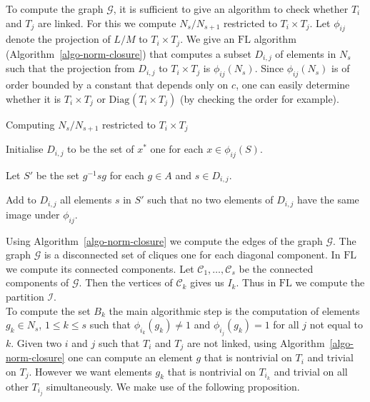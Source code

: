 \documentclass[11pt]{madras}%
\theoremstyle{remark}
\newcommand{\Diag}[2][]{{\ensuremath{\mathrm{Diag}_{{#1}}\left(#2\right)}}}
\begin{document}
To compute the graph $\mathcal{G}$, it is sufficient to give an
algorithm to check whether $T_i$ and $T_j$ are linked.  For this we
compute $N_s/N_{s+1}$ restricted to $T_i \times T_j$. Let $\phi_{ij}$
denote the projection of $L/M$ to $T_i \times T_j$. We give an
$\mathrm{FL}$ algorithm (Algorithm~\ref{algo-norm-closure}) that
computes a subset $D_{i,j}$ of elements in $N_s$ such that the
projection from $D_{i,j}$ to $T_i \times T_j$ is $\phi_{ij}(N_s)$.
Since $\phi_{ij}(N_s)$ is of order bounded by a constant that depends
only on $c$, one can easily determine whether it is $T_i \times T_j$
or $\Diag{T_i\times T_j}$ (by checking the order for example).


\begin{algorithm}[h]
  \caption{Computing ${N_s}/{N_{s+1}}$ restricted to $T_i \times T_j$}
  \label{algo-norm-closure}
   
  Initialise $D_{i,j}$ to be the set of $x^*$ one for each $x \in
  \phi_{ij}(S)$.

   {

    Let $S'$ be the set $g^{-1} s g$ for each $g \in A$ and $s \in
    D_{i,j}$.
    
    Add to $D_{i,j}$ all elements $s$ in $S'$ such that no two
    elements of $D_{i,j}$ have the same image under $\phi_{ij}$.

  } 

\end{algorithm}

Using Algorithm~\ref{algo-norm-closure} we compute the edges of the
graph $\mathcal{G}$. The graph $\mathcal{G}$ is a disconnected set of
cliques one for each diagonal component.  In $\mathrm{FL}$ we compute
its connected components. Let $\mathcal{C}_1,\ldots,\mathcal{C}_s$ be
the connected components of $\mathcal{G}$. Then the vertices of
$\mathcal{C}_k$ gives us $I_k$. Thus in $\mathrm{FL}$ we compute the
partition
$\mathcal{I}$. \\

 To compute the set $B_k$ the main
algorithmic step is the computation of elements $g_k \in N_s$, $1
\leq k \leq s$ such that $\phi_{i_k}(g_k) \neq 1$ and $\phi_{i_j}(g_k)
= 1$ for all $j$ not equal to $k$.  Given two $i$ and $j$ such that
$T_i$ and $T_j$ are not linked, using
Algorithm~\ref{algo-norm-closure} one can compute an element $g$ that
is nontrivial on $T_i$ and trivial on $T_j$. However we want elements
$g_k$ that is nontrivial on $T_{i_k}$ and trivial on all other
$T_{i_j}$ simultaneously.  We make use of the following proposition.
\end{document}
